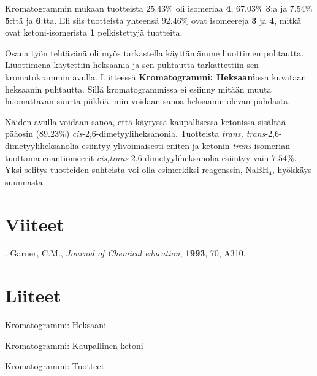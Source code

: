 \documentclass[11pt,a4paper]{article}
\begin{document}
Kromatogrammin mukaan tuotteista $25.43 \%$ oli isomeriaa \textbf{4}, $67.03\%$ \textbf{3}:a ja $7.54\%$ \textbf{5}:ttä ja \textbf{6}:tta. Eli siis tuotteista yhteensä 92.46$\%$ ovat isomeereja \textbf{3} ja \textbf{4}, mitkä ovat ketoni-isomerista \textbf{1} pelkistettyjä tuotteita.

Osana työn tehtävänä oli myös tarkastella käyttämämme liuottimen puhtautta. Liuottimena käytettiin heksaania ja sen puhtautta tarkattettiin sen kromatokrammin avulla. Liitteessä \textbf{Kromatogrammi: Heksaani}:ssa kuvataan heksaanin puhtautta. Sillä kromatogrammissa ei esiinny mitään muuta huomattavan suurta piikkiä, niin voidaan sanoa heksaanin olevan puhdasta. 

Näiden avulla voidaan sanoa, että käytyssä kaupallisessa ketonissa sisältää pääosin (89.23$\%$) \textit{cis}-2,6-dimetyyliheksanonia. Tuotteista \textit{trans,\- trans}-2,6-dimetyyliheksanolia esiintyy ylivoimaisesti eniten ja ketonin \textit{trans}-isomerian tuottama enantiomeerit \textit{cis,trans}-2,6-dimetyyliheksanolia esiintyy vain $7.54\%$.  Yksi selitys tuotteiden suhteista voi olla esimerkiksi reagenssin, NaBH$_4$, hyökkäys suunnasta. 

\noindent



\pagebreak


\section{Viiteet}

. Garner, C.M., \textit{Journal of Chemical education}, \textbf{1993}, 70, A310.

\section{Liiteet}

\noindent Kromatogrammi: Heksaani

\noindent Kromatogrammi: Kaupallinen ketoni

\noindent Kromatogrammi: Tuotteet
\end{document}
